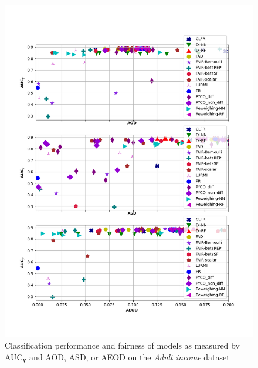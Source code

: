 \documentclass[preprint,12pt]{elsarticle}
\begin{document}
\iffalse
\begin{figure}
	\center
	\includegraphics[angle=0, width=1\textwidth]{Adult_all.png}
	\captionsetup{justification=centering}
	\caption{Classification performance and fairness of models as measured by AUC$_\mathbf{y}$ and AOD, ASD, or AEOD on the \textit{Adult income} dataset}
	\label{fig:Adult all}
	\vskip -0.2in
\end{figure}
\end{document}
